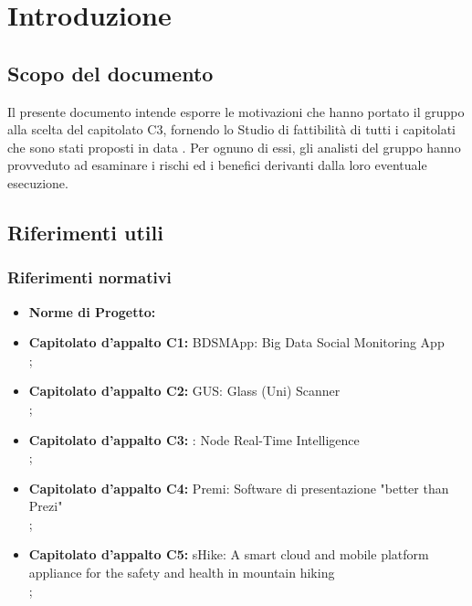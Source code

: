 \section{Introduzione}

	\subsection{Scopo del documento}
		Il presente documento intende esporre le motivazioni che hanno portato il gruppo alla scelta del capitolato C3, fornendo lo Studio di fattibilità di tutti i capitolati che sono stati proposti in data . Per ognuno di essi, gli analisti del gruppo hanno provveduto ad esaminare i rischi ed i benefici derivanti dalla loro eventuale esecuzione.
	
	


	\subsection{Riferimenti utili}

		\subsubsection{Riferimenti normativi}
			\begin{itemize}
				\item \textbf{Norme di Progetto:} 
				\item \textbf{Capitolato d'appalto C1:} BDSMApp: Big Data Social Monitoring App\\
					;
				\item \textbf{Capitolato d'appalto C2:} GUS: Glass (Uni) Scanner\\
					;
				\item \textbf{Capitolato d'appalto C3:} \projectname: Node Real-Time Intelligence\\
					;
				\item \textbf{Capitolato d'appalto C4:} Premi: Software di presentazione "better than Prezi"\\
					;
				\item \textbf{Capitolato d'appalto C5:} sHike: A smart cloud and mobile platform appliance for the safety and health in mountain hiking\\
					;
			\end{itemize}

